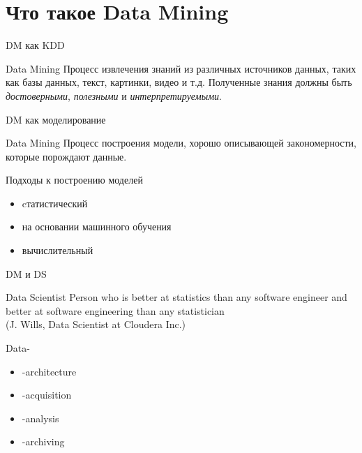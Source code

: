 \documentclass[10pt]{beamer}
\begin{document}
\section{Что такое Data Mining}

\begin{frame}{DM как KDD}

\begin{block}{Data Mining}
Процесс извлечения знаний из различных источников данных, таких как базы данных, текст, картинки, видео и т.д. Полученные знания должны быть {\it достоверными}, {\it полезными} и {\it интерпретируемыми}.
\end{block}

\end{frame}

\begin{frame}{DM как моделирование}

\begin{block}{Data Mining}
Процесс построения модели, хорошо описывающей закономерности, которые порождают данные.
\end{block}

\vspace{1em}
Подходы к построению моделей
\begin{itemize}
\item[\color{green}\ding{52}] cтатистический
\item[\color{green}\ding{52}] на основании машинного обучения
\item[\color{red}\ding{54}] вычислительный
\end{itemize}

\end{frame}

\begin{frame}{DM и DS}

\begin{block}{Data Scientist}
Person who is better at statistics than any software engineer and better at software engineering than any statistician \\ (J. Wills, Data Scientist at Cloudera Inc.)
\end{block}

\vspace{1em}
Data-
\begin{itemize}
\item[\color{red}\ding{54}] -architecture
\item[\color{red}\ding{54}] -acquisition
\item[\color{green}\ding{52}] -analysis
\item[\color{red}\ding{54}] -archiving
\end{itemize}

\end{frame}
\end{document}
